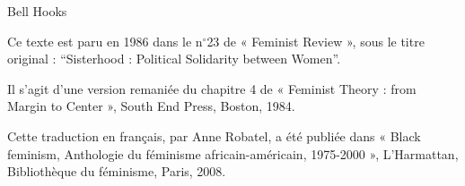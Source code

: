 \begin{flushright}
  Bell Hooks
\end{flushright}

\vfill

{\small
  Ce texte est paru en 1986 dans le n$^\circ$23 de « Feminist Review », sous le titre original : ``Sisterhood : Political Solidarity between Women''.
  
  Il s’agit d’une version remaniée du chapitre 4 de « Feminist Theory : from Margin to Center », South End Press, Boston, 1984.
  
  Cette traduction en français, par Anne Robatel, a été publiée dans « Black feminism, Anthologie du féminisme africain-américain, 1975-2000 », L’Harmattan, Bibliothèque du féminisme, Paris, 2008.
}